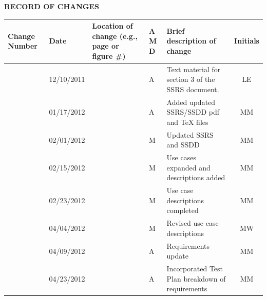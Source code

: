\documentclass[twoside,letterpaper]{article}
\begin{document}


\bigskip





{\centering\bfseries RECORD OF CHANGES \par}


\bigskip

\begin{flushleft}
\tablehead{}
\begin{supertabular}[c]{|m{0.75in}|m{1.0in}|m{1.5in}|m{0.25in}|m{2in}|c|}
\hline

\centering \bfseries Change
\centering \bfseries Number
&

\centering \bfseries Date
\par
&

\centering \bfseries Location of change\newline
\centering \bfseries(e.g., page or figure \#)
&

\centering \bfseries A\newline
\centering \bfseries M\newline
\centering \bfseries D  
&

\centering \bfseries Brief description\newline
\centering \bfseries of change
&
\bfseries Initials
\\\hline

& 12/10/2011
& ~
& \centering A
& Text material for section 3 of the SSRS document.
& LE

\\\hline
{}
& 01/17/2012
& ~
& \centering A
& Added updated SSRS/SSDD pdf and TeX files
& MM

\\\hline
{}
& 02/01/2012
& ~
& \centering M
& Updated SSRS and SSDD
& MM

\\\hline
{}
& 02/15/2012
& ~
& \centering M
& Use cases expanded and descriptions added
& MM

\\\hline
{}
& 02/23/2012
& ~
& \centering M
& Use case descriptions completed
& MM

\\\hline
{}
& 04/04/2012
& ~
& \centering M
& Revised use case descriptions
& MW

\\\hline
{}
& 04/09/2012
& ~
& \centering A
& Requirements update
& MM

\\\hline
{}
& 04/23/2012
& ~
& \centering A
& Incorporated Test Plan breakdown of requirements
& MM

\\\hline
\end{supertabular}
\end{flushleft}
\end{document}
